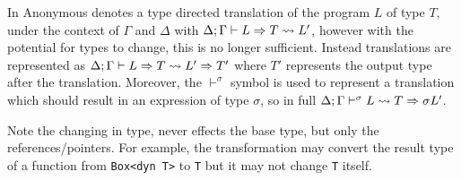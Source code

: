 \documentclass[ oneside,%
                    author={James Elgar},
                    degree={MEng},
                     title={Bidirectional transformer between functional and \\ object-oriented programming in Rust},
                  subtitle={}]{dissertation}
\newcommand{\weixin}{Anonymous }
\newcommand{\rust}[1]{\texttt{#1}}
\begin{document}
% 

In \cite{food} \weixin denotes a type directed translation of the program $L$ of type $T$, under the context of $\Gamma$ and $\Delta$ with $\Delta; \Gamma \vdash L \Rightarrow T \leadsto L'$, however with the potential for types to change, this is no longer sufficient. Instead translations are represented as $\Delta; \Gamma \vdash L \Rightarrow T \leadsto L' \Rightarrow T'$ where $T'$ represents the output type after the translation. Moreover, the $\vdash^{\sigma}$ symbol is used to represent a translation which should result in an expression of type $\sigma$, so in full $\Delta; \Gamma {} \vdash^{\sigma} {L} {} \leadsto {T} \Rightarrow {\sigma} {L'}$.

Note the changing in type, never effects the base type, but only the references/pointers. For example, the transformation may convert the result type of a function from \rust{Box<dyn T>} to \rust{T} but it may not change \rust{T} itself.
\end{document}
